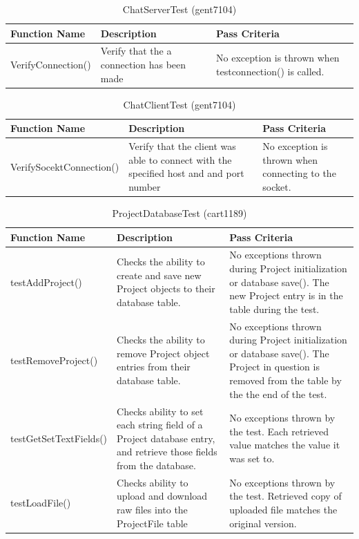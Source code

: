 \documentclass[twoside,letterpaper]{article}
\begin{document}
\begin{table}[h]
	\centering
	\caption{ChatServerTest (gent7104)}
	\begin{tabular}{|p{4cm}|p{5cm}|p{6cm}|}
		\hline
		\textbf{Function Name} & \textbf{Description} & \textbf{Pass Criteria}  \\\hline
		VerifyConnection() & Verify that the a connection has been made & No exception is thrown when testconnection() is called. \\\hline
	\end{tabular}
\end{table}

\begin{table}[h]
	\centering
	\caption{ChatClientTest (gent7104)}
	\begin{tabular}{|p{4cm}|p{5cm}|p{6cm}|}
		\hline
		\textbf{Function Name} & \textbf{Description} & \textbf{Pass Criteria}  \\\hline
		VerifySocektConnection() & Verify that the client was able to connect with the specified host and and port number & No exception is thrown when connecting to the socket. \\\hline
	\end{tabular}
\end{table}
\begin{table}[h]
	\centering
	\caption{ProjectDatabaseTest (cart1189)}
	\begin{tabular}{|p{4cm}|p{5cm}|p{6cm}|}
		\hline
		\textbf{Function Name} & \textbf{Description} & \textbf{Pass Criteria}  \\\hline
		testAddProject() & Checks the ability to create and save new Project objects to their database table. & No exceptions thrown during Project initialization or database save(). The new Project entry is in the table during the test. \\\hline
		testRemoveProject() & Checks the ability to remove Project object entries from their database table. & No exceptions thrown during Project initialization or database save(). The Project in question is removed from the table by the the end of the test. \\\hline
		testGetSetTextFields() & Checks ability to set each string field of a Project database entry, and retrieve those fields from the database. & No exceptions thrown by the test. Each retrieved value matches the value it was set to. \\\hline
		testLoadFile() & Checks ability to upload and download raw files into the ProjectFile table & No exceptions thrown by the test. Retrieved copy of uploaded file matches the original version. \\\hline
	\end{tabular}
\end{table}
\clearpage
\end{document}
